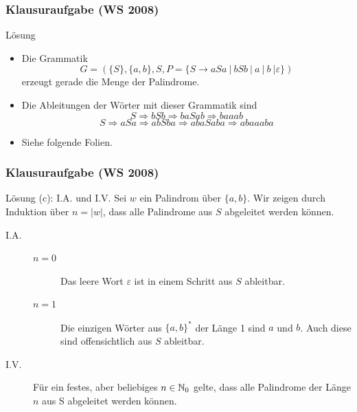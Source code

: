 \begin{frame}
	\frametitle{Klausuraufgabe (WS 2008)}
	\begin{block}{Lösung}
	\begin{itemize}
		\item[(a)] Die Grammatik $$G = (\{S\}, \{a, b\}, S, P = \{S \to aSa \ | \ bSb \ | \ a \ | \ b \ | \varepsilon \})$$ erzeugt gerade die Menge der Palindrome.
		\item[(b)] Die Ableitungen der Wörter mit dieser Grammatik sind 
				$$S \Rightarrow bSb \Rightarrow baSab \Rightarrow baaab$$
				$$S \Rightarrow aSa \Rightarrow abSba \Rightarrow abaSaba \Rightarrow abaaaba$$
		\item[(c)] Siehe folgende Folien.
	\end{itemize}	
	\end{block}
\end{frame}

\begin{frame}
	\frametitle{Klausuraufgabe (WS 2008)}

	\begin{block}{Lösung (c): I.A. und I.V.}
	Sei $w$ ein Palindrom über $\{a, b\}$. Wir zeigen durch Induktion über $n = \vert w \vert$, dass alle Palindrome aus $S$ abgeleitet werden können.
	\begin{description}
		\item[I.A.] \begin{description}
						\item[$n = 0$] Das leere Wort $\varepsilon$ ist in einem Schritt aus $S$ ableitbar.
						\item[$n = 1$] Die einzigen Wörter aus $\{a, b\}^\ast$ der Länge 1 sind $a$ und $b$. Auch diese sind offensichtlich aus $S$ ableitbar. 
					\end{description}
		\item[I.V.] Für ein festes, aber beliebiges $n \in \mathbb{N}_0$ gelte, dass alle Palindrome der Länge $n$ aus S abgeleitet werden können. 
		
	\end{description}
	\end{block}
\end{frame}

